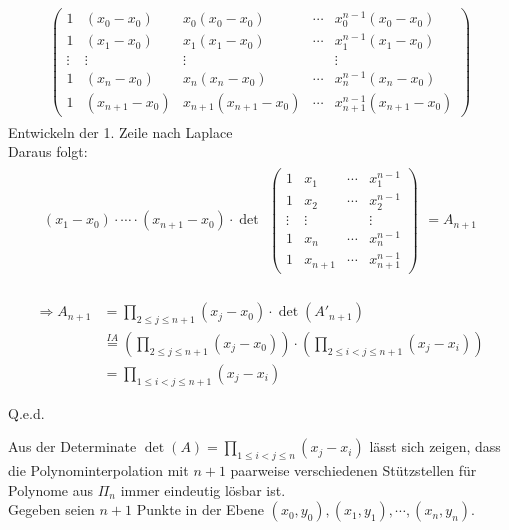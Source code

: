 \begin{itemize}
\begin{align*}
\begin{split}
	\begin{pmatrix}
	1 & (x_0-x_0) & x_0(x_0-x_0) & \cdots & x_0^{n-1}(x_0-x_0) \\
	1 & (x_1-x_0) & x_1(x_1-x_0) & \cdots & x_1^{n-1}(x_1-x_0) \\
	\vdots & \vdots & \vdots &  & \vdots \\
	1 & (x_n-x_0) & x_n(x_n-x_0) & \cdots & x_n^{n-1}(x_n-x_0)\\
	1 & (x_{n+1}-x_0) & x_{n+1}(x_{n+1}-x_0) & \cdots & x_{n+1}^{n-1}(x_{n+1}-x_0)
	\end{pmatrix}
	\end{split}
	\end{align*}
	Entwickeln der 1. Zeile nach Laplace\\
	Daraus folgt:\\
	\begin{align*}
	(x_1-x_0)\cdot \cdots \cdot (x_{n+1}-x_0) \cdot \det
	\begin{split}
	\begin{pmatrix}
	1 & x_1 & \cdots & x_1^{n-1} \\
	1 & x_2 & \cdots & x_2^{n-1} \\
	\vdots & \vdots &  & \vdots \\
	1 & x_n & \cdots & x_n^{n-1}\\
	1 & x_{n+1} & \cdots & x_{n+1}^{n-1}
	\end{pmatrix}
	\end{split}
	=A_{n+1}
	\end{align*}\\
	\begin{align*}
	\Rightarrow A_{n+1} &= \prod \limits_{2 \leq j \leq n+1}(x_j-x_0)\cdot \det(A'_{n+1})\\
	&\stackrel{IA}{=} (\prod \limits_{2 \leq j \leq n+1}(x_j-x_0))\cdot (\prod \limits_{2 \leq i < j \leq n+1}(x_j-x_i))\\
	&= \prod \limits_{1 \leq i < j \leq n+1}(x_j-x_i)
	\end{align*}
\end{itemize}
	\begin{flushright}
		Q.e.d.
	\end{flushright}
	Aus der Determinate $\det(A)=\prod \limits_{1 \leq i < j \leq n}(x_j-x_i)$ lässt sich zeigen, dass die Polynominterpolation mit $n+1$ paarweise verschiedenen Stützstellen für Polynome aus $\Pi_n$ immer eindeutig lösbar ist.\\
	Gegeben seien $n+1$ Punkte in der Ebene $(x_0,y_0),(x_1,y_1),\cdots,(x_n,y_n)$.\\
